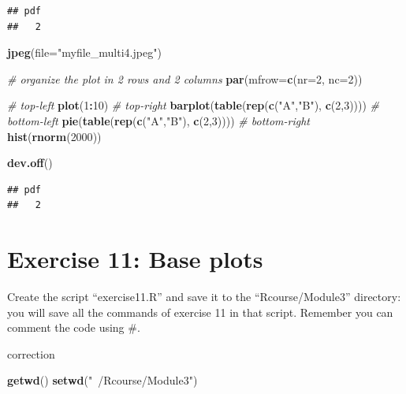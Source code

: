 \documentclass[]{book}
\newenvironment{Shaded}{\begin{snugshade}}{\end{snugshade}}
\newcommand{\CommentTok}[1]{\textcolor[rgb]{0.56,0.35,0.01}{\textit{#1}}}
\newcommand{\DataTypeTok}[1]{\textcolor[rgb]{0.13,0.29,0.53}{#1}}
\newcommand{\DecValTok}[1]{\textcolor[rgb]{0.00,0.00,0.81}{#1}}
\newcommand{\KeywordTok}[1]{\textcolor[rgb]{0.13,0.29,0.53}{\textbf{#1}}}
\newcommand{\NormalTok}[1]{#1}
\newcommand{\OperatorTok}[1]{\textcolor[rgb]{0.81,0.36,0.00}{\textbf{#1}}}
\newcommand{\StringTok}[1]{\textcolor[rgb]{0.31,0.60,0.02}{#1}}
\begin{document}
\begin{verbatim}
## pdf 
##   2
\end{verbatim}

\begin{Shaded}
\begin{Highlighting}[]
\KeywordTok{jpeg}\NormalTok{(}\DataTypeTok{file=}\StringTok{"myfile_multi4.jpeg"}\NormalTok{)}

\CommentTok{# organize the plot in 2 rows and 2 columns}
\KeywordTok{par}\NormalTok{(}\DataTypeTok{mfrow=}\KeywordTok{c}\NormalTok{(}\DataTypeTok{nr=}\DecValTok{2}\NormalTok{, }\DataTypeTok{nc=}\DecValTok{2}\NormalTok{))}

\CommentTok{# top-left}
\KeywordTok{plot}\NormalTok{(}\DecValTok{1}\OperatorTok{:}\DecValTok{10}\NormalTok{)}
\CommentTok{# top-right}
\KeywordTok{barplot}\NormalTok{(}\KeywordTok{table}\NormalTok{(}\KeywordTok{rep}\NormalTok{(}\KeywordTok{c}\NormalTok{(}\StringTok{"A"}\NormalTok{,}\StringTok{"B"}\NormalTok{), }\KeywordTok{c}\NormalTok{(}\DecValTok{2}\NormalTok{,}\DecValTok{3}\NormalTok{))))}
\CommentTok{# bottom-left}
\KeywordTok{pie}\NormalTok{(}\KeywordTok{table}\NormalTok{(}\KeywordTok{rep}\NormalTok{(}\KeywordTok{c}\NormalTok{(}\StringTok{"A"}\NormalTok{,}\StringTok{"B"}\NormalTok{), }\KeywordTok{c}\NormalTok{(}\DecValTok{2}\NormalTok{,}\DecValTok{3}\NormalTok{))))}
\CommentTok{# bottom-right}
\KeywordTok{hist}\NormalTok{(}\KeywordTok{rnorm}\NormalTok{(}\DecValTok{2000}\NormalTok{))}

\KeywordTok{dev.off}\NormalTok{()}
\end{Highlighting}
\end{Shaded}

\begin{verbatim}
## pdf 
##   2
\end{verbatim}

\hypertarget{exercise-11-base-plots}{%
\section{Exercise 11: Base plots}\label{exercise-11-base-plots}}

Create the script ``exercise11.R'' and save it to the ``Rcourse/Module3'' directory: you will save all the commands of exercise 11 in that script.
Remember you can comment the code using \#.

correction

\begin{Shaded}
\begin{Highlighting}[]
\KeywordTok{getwd}\NormalTok{()}
\KeywordTok{setwd}\NormalTok{(}\StringTok{"~/Rcourse/Module3"}\NormalTok{)}
\end{Highlighting}
\end{Shaded}
\end{document}
